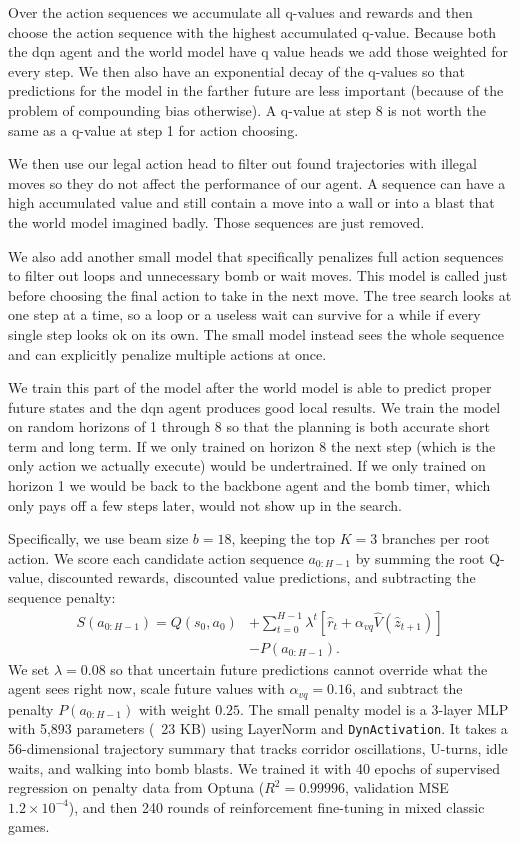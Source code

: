 Over the action sequences we accumulate all q-values and rewards and then choose the action sequence with the highest accumulated q-value. Because both the dqn agent and the world model have q value heads we add those weighted for every step. We then also have an exponential decay of the q-values so that predictions for the model in the farther future are less important (because of the problem of compounding bias otherwise). A q-value at step 8 is not worth the same as a q-value at step 1 for action choosing.

We then use our legal action head to filter out found trajectories with illegal moves so they do not affect the performance of our agent. A sequence can have a high accumulated value and still contain a move into a wall or into a blast that the world model imagined badly. Those sequences are just removed.

We also add another small model that specifically penalizes full action sequences to filter out loops and unnecessary bomb or wait moves. This model is called just before choosing the final action to take in the next move. The tree search looks at one step at a time, so a loop or a useless wait can survive for a while if every single step looks ok on its own. The small model instead sees the whole sequence and can explicitly penalize multiple actions at once. 

We train this part of the model after the world model is able to predict proper future states and the dqn agent produces good local results. We train the model on random horizons of 1 through 8 so that the planning is both accurate short term and long term. If we only trained on horizon 8 the next step (which is the only action we actually execute) would be undertrained. If we only trained on horizon 1 we would be back to the backbone agent and the bomb timer, which only pays off a few steps later, would not show up in the search.

Specifically, we use beam size $b=18$, keeping the top $K=3$ branches per root action. We score each candidate action sequence $a_{0:H-1}$ by summing the root Q-value, discounted rewards, discounted value predictions, and subtracting the sequence penalty:
\begin{equation}
\begin{aligned}
S(a_{0:H-1}) = Q(s_0, a_0) &+ \sum_{t=0}^{H-1} \lambda^t \left[\hat{r}_t + \alpha_{vq} \hat{V}(\hat{z}_{t+1})\right] \\
&- P(a_{0:H-1}).
\end{aligned}
\end{equation}
We set $\lambda = 0.08$ so that uncertain future predictions cannot override what the agent sees right now, scale future values with $\alpha_{vq} = 0.16$, and subtract the penalty $P(a_{0:H-1})$ with weight $0.25$. The small penalty model is a 3-layer MLP with 5,893 parameters (~23 KB) using LayerNorm and \texttt{DynActivation}. It takes a 56-dimensional trajectory summary that tracks corridor oscillations, U-turns, idle waits, and walking into bomb blasts. We trained it with 40 epochs of supervised regression on penalty data from Optuna ($R^2 = 0.99996$, validation MSE $1.2 \times 10^{-4}$), and then 240 rounds of reinforcement fine-tuning in mixed classic games.

